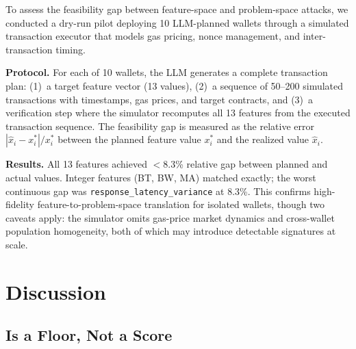 \documentclass[sigconf,nonacm=false]{acmart}
\begin{document}
To assess the feasibility gap between feature-space and problem-space attacks, we conducted a dry-run pilot deploying 10 LLM-planned wallets through a simulated transaction executor that models gas pricing, nonce management, and inter-transaction timing.

\noindent\textbf{Protocol.}
For each of 10 wallets, the LLM generates a complete transaction plan: (1)~a target feature vector (13 values), (2)~a sequence of 50--200 simulated transactions with timestamps, gas prices, and target contracts, and (3)~a verification step where the simulator recomputes all 13 features from the executed transaction sequence.
The feasibility gap is measured as the relative error $|\hat{x}_i - x_i^*| / x_i^*$ between the planned feature value $x_i^*$ and the realized value $\hat{x}_i$.

\noindent\textbf{Results.}
All 13 features achieved $<$8.3\% relative gap between planned and actual values. Integer features (BT, BW, MA) matched exactly; the worst continuous gap was \texttt{response\_latency\_variance} at 8.3\%.
This confirms high-fidelity feature-to-problem-space translation for isolated wallets, though two caveats apply: the simulator omits gas-price market dynamics and cross-wallet population homogeneity, both of which may introduce detectable signatures at scale.


\section{Discussion}
\label{sec:discussion}

\subsection{\bestResponseAucFloorMean{} Is a Floor, Not a Score}
\end{document}
